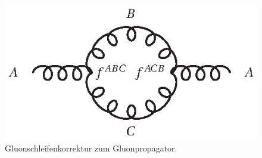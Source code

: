 \begin{figure}[h]
 \centering
 \includegraphics{abschnitte/n-schleifen/fig/QCD1.eps}
 \caption{Gluonschleifenkorrektur zum Gluonpropagator.}\label{fig:n-schleifen:QCD1}
\end{figure}
